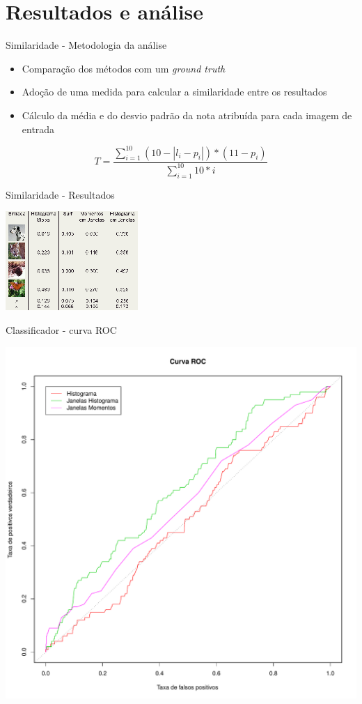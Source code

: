 \documentclass[
    style=paintings,
    paper=screen,
    blackslide,
    nopagebreaks,
    fleqn
]{powerdot}
\begin{document}
\section[slide=false]{Resultados e análise}
\begin{slide}{Similaridade - Metodologia da análise}
\begin{itemize}[type=1]
\item <1-> Comparação dos métodos com um \it{ground truth}
\item <2-> Adoção de uma medida para calcular a similaridade entre os resultados 
\item <3-> Cálculo da média e do desvio padrão da nota atribuída para cada imagem de entrada 
\end{itemize}
\pause$$T = \frac{\sum\limits_{i=1}^{10}(10-|l_i-p_i|) * (11-p_i)}{\sum\limits_{i=1}^{10}10*i}$$
\end{slide}


\begin{slide}{Similaridade - Resultados}
\begin{center}
\includegraphics[width=0.80\linewidth]{img/tabela1}
\end{center}
\end{slide}


\begin{slide}{Classificador - curva ROC}
\begin{center}
\includegraphics[width=0.65\linewidth]{img/curvaroc}
\end{center}
\end{slide}
\end{document}
